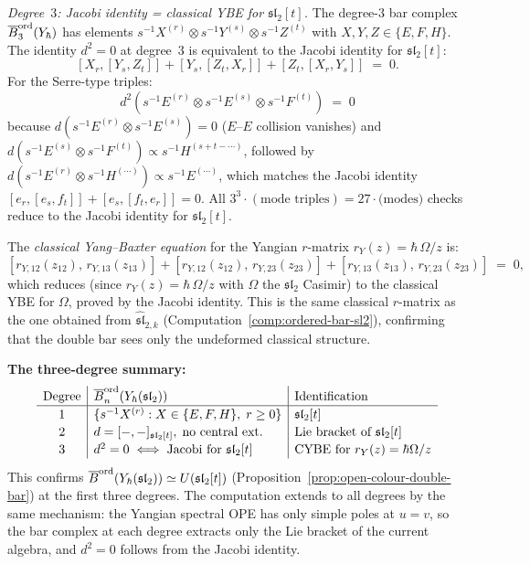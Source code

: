 \begin{computation}
\emph{Degree~$3$: Jacobi identity = classical YBE for
$\mathfrak{sl}_2[t]$.}\enspace
The degree-$3$ bar complex
$\overline{B}^{\mathrm{ord}}_3(Y_\hbar)$ has elements
$s^{-1}X^{(r)}\otimes s^{-1}Y^{(s)}\otimes s^{-1}Z^{(t)}$
with $X,Y,Z \in \{E,F,H\}$. The identity $d^2 = 0$
at degree~$3$ is equivalent to the Jacobi identity for
$\mathfrak{sl}_2[t]$:
\[
[X_r,[Y_s,Z_t]] + [Y_s,[Z_t,X_r]] + [Z_t,[X_r,Y_s]]
\;=\;0.
\]
For the Serre-type triples:
\[
d^2(s^{-1}E^{(r)}\otimes s^{-1}E^{(s)}\otimes
s^{-1}F^{(t)})
\;=\;0
\]
because $d(s^{-1}E^{(r)}\otimes s^{-1}E^{(s)}) = 0$
($E$--$E$ collision vanishes) and
$d(s^{-1}E^{(s)}\otimes s^{-1}F^{(t)})
\propto s^{-1}H^{(s+t-\cdots)}$, followed by
$d(s^{-1}E^{(r)}\otimes s^{-1}H^{(\cdots)})
\propto s^{-1}E^{(\cdots)}$, which matches the
Jacobi identity
$[e_r,[e_s,f_t]] + [e_s,[f_t,e_r]] = 0$.
All $3^3 \cdot (\text{mode triples}) = 27 \cdot
\text{(modes)}$ checks reduce to the Jacobi identity
for $\mathfrak{sl}_2[t]$.

The \emph{classical Yang--Baxter equation} for the
Yangian $r$-matrix
$r_Y(z) = \hbar\,\Omega/z$ is:
\[
[r_{Y,12}(z_{12}),\,r_{Y,13}(z_{13})]
+ [r_{Y,12}(z_{12}),\,r_{Y,23}(z_{23})]
+ [r_{Y,13}(z_{13}),\,r_{Y,23}(z_{23})]
\;=\;0,
\]
which reduces (since $r_Y(z) = \hbar\,\Omega/z$ with
$\Omega$ the $\mathfrak{sl}_2$ Casimir) to the
classical YBE for $\Omega$, proved by the Jacobi
identity. This is the same classical $r$-matrix
as the one obtained from
$\widehat{\mathfrak{sl}}_{2,k}$
(Computation~\ref{comp:ordered-bar-sl2}), confirming
that the double bar sees only the undeformed classical
structure.

\textbf{The three-degree summary:}
\[
\renewcommand{\arraystretch}{1.15}
\begin{array}{c|l|l}
\text{Degree}
 & \Barchord_n(Y_\hbar(\mathfrak{sl}_2))
 & \text{Identification} \\
\hline
1 & \{s^{-1}X^{(r)} : X \in \{E,F,H\},\;r\ge 0\}
 & \mathfrak{sl}_2[t] \\
2 & d = [-,-]_{\mathfrak{sl}_2[t]},\;\text{no central ext.}
 & \text{Lie bracket of } \mathfrak{sl}_2[t] \\
3 & d^2 = 0 \iff \text{Jacobi for } \mathfrak{sl}_2[t]
 & \text{CYBE for } r_Y(z)=\hbar\Omega/z
\end{array}
\]
This confirms
$\overline{B}^{\mathrm{ord}}(Y_\hbar(\mathfrak{sl}_2))
\simeq U(\mathfrak{sl}_2[t])$
(Proposition~\ref{prop:open-colour-double-bar})
at the first three degrees. The computation extends
to all degrees by the same mechanism: the Yangian
spectral OPE has only simple poles at $u = v$, so
the bar complex at each degree extracts only the Lie
bracket of the current algebra, and $d^2 = 0$
follows from the Jacobi identity.


\end{computation}
